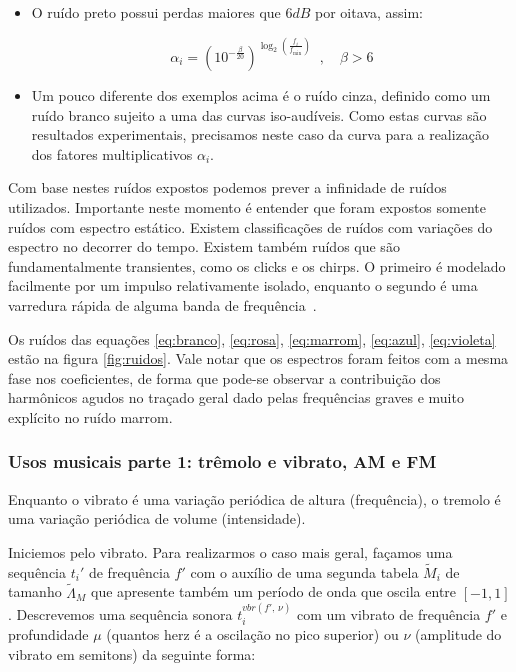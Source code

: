 \begin{itemize}
\item O ruído preto possui perdas maiores que $6dB$ por oitava, assim:

\begin{equation}\label{eq:preto}
\alpha_i=(10^{-\frac{\beta}{20}})^{\log _2 \left( \frac{f_i}{f_{\text{min}}} \right )}\;\;, \quad \beta > 6
\end{equation}



\item Um pouco diferente dos exemplos acima é o ruído cinza, definido como
um ruído branco sujeito a uma das curvas iso-audíveis. Como estas curvas são resultados
experimentais, precisamos neste caso da curva para a realização dos fatores multiplicativos
$\alpha_i$.

\end{itemize}

Com base nestes ruídos expostos podemos prever a infinidade de ruídos utilizados. Importante
neste momento é entender que foram expostos somente ruídos com espectro estático. Existem classificações
de ruídos com variações do espectro no decorrer do tempo. Existem também ruídos que
são fundamentalmente transientes, como os clicks e os chirps. O primeiro é modelado
facilmente por um impulso relativamente isolado, enquanto o segundo é uma varredura rápida de 
alguma banda de frequência~\cite{Cook}.

Os ruídos das equações \ref{eq:branco}, \ref{eq:rosa}, \ref{eq:marrom},
\ref{eq:azul}, \ref{eq:violeta} estão na figura \ref{fig:ruidos}. Vale notar
que os espectros foram feitos com a mesma fase nos coeficientes, de forma que
pode-se observar a contribuição dos harmônicos agudos no traçado geral dado
pelas frequências graves e muito explícito no ruído marrom.


\subsubsection{Usos musicais parte 1: trêmolo e vibrato, AM e FM}

Enquanto o vibrato é uma variação periódica de altura (frequência),
o tremolo é uma variação periódica de volume (intensidade).

Iniciemos pelo vibrato. Para realizarmos o caso mais geral, façamos uma sequência $t_i'$
de frequência $f'$ com o auxílio
de uma segunda tabela $\widetilde{M}_i$ de tamanho $\widetilde{\Lambda}_M$ que apresente também
um período de onda que oscila entre $[-1,1]$. Descrevemos uma sequência sonora $t_i^{vbr(f',\,\nu)}$ com
um vibrato de frequência $f'$ e profundidade  $\mu$ (quantos herz é a oscilação no pico superior)
ou $\nu$ (amplitude do vibrato em semitons) da seguinte forma:


